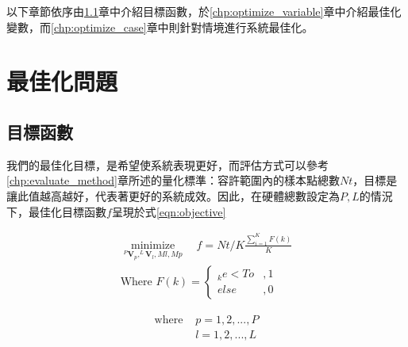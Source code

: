 




以下章節依序由\ref{chp:objective}章中介紹目標函數，於\ref{chp:optimize_variable}章中介紹最佳化變數，而\ref{chp:optimize_case}章中則針對情境進行系統最佳化。

\section{最佳化問題}
\label{chp:optimize}
    \subsection{目標函數}
    \label{chp:objective}

    我們的最佳化目標，是希望使系統表現更好，而評估方式可以參考\ref{chp:evaluate_method}章所述的量化標準：容許範圍內的樣本點總數$Nt$，目標是讓此值越高越好，代表著更好的系統成效。因此，在硬體總數設定為$P,L$的情況下，最佳化目標函數$f$呈現於式\ref{eqn:objective}

    \begin{equation}
        \label{eqn:objective}
        \begin{aligned}
        \underset{^{P}\boldsymbol{V}_p, ^{L}\boldsymbol{V}_l,Ml,Mp}{\operatorname{minimize}} 
        \quad f = Nt/K
        \frac{\sum_{i=1}^{K}F(k)}{K}  \\
        \text{Where }F(k)=
        \begin{cases}
            _{k}e<To&,1\\
            else&,0
        \end{cases}
        \end{aligned}
    \end{equation}

    \begin{align*} \text{where }
        &p=1,2,...,P\\&l=1,2,...,L
    \end{align*}


